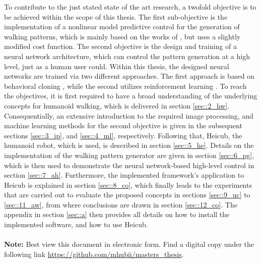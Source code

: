 To contribute to the just stated state of the art research, a twofold objective is to be achieved within the scope of this thesis. The first sub-objective is the implementation of a nonlinear model predictive control for the generation of walking patterns, which is mainly based on the works of \cite{naveau2016reactive}, but uses a slightly modified cost function. The second objective is the design and training of a neural network architecture, which can control the pattern generation at a high level, just as a human user could. Within this thesis, the designed neural networks are trained via two different approaches. The first approach is based on behavioral cloning \cite{bojarski2016end}, while the second utilizes reinforcement learning \cite{schulman2017proximal}. To reach the objectives, it is first required to have a broad understanding of the underlying concepts for humanoid walking, which is delivered in section \ref{sec::2_hw}. Consequentially, an extensive introduction to the required image processing, and machine learning methods for the second objective is given in the subsequent sections \ref{sec::3_ip}, and \ref{sec::4_ml}, respectively. Following that, Heicub, the humanoid robot, which is used, is described in section \ref{sec::5_he}. Details on the implementation of the walking pattern generator are given in section \ref{sec::6_pg}, which is then used to demonstrate the neural network-based high-level control in section \ref{sec::7_ah}. Furthermore, the implemented framework's application to Heicub is explained in section \ref{sec::8_co}, which finally leads to the experiments that are carried out to evaluate the proposed concepts in sections \ref{sec::9_uc} to \ref{sec::11_aw}, from where conclusions are drawn in section \ref{sec::12_co}. The appendix in section \ref{sec::a} then provides all details on how to install the implemented software, and how to use Heicub.
\\\\
\textbf{Note:} Best view this document in electronic form. Find a digital copy under the following link \href{https://github.com/mhubii/masters_thesis}{\underline{https://github.com/mhubii/masters\_thesis}}.
